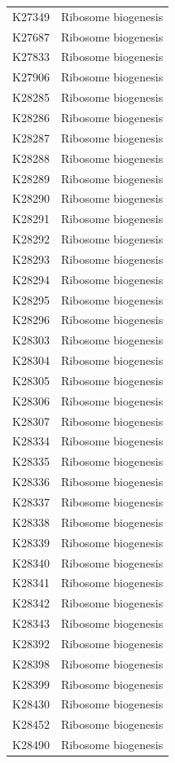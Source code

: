 \begin{longtable}{@{}l l@{}}
K27349 & Ribosome biogenesis \\
K27687 & Ribosome biogenesis \\
K27833 & Ribosome biogenesis \\
K27906 & Ribosome biogenesis \\
K28285 & Ribosome biogenesis \\
K28286 & Ribosome biogenesis \\
K28287 & Ribosome biogenesis \\
K28288 & Ribosome biogenesis \\
K28289 & Ribosome biogenesis \\
K28290 & Ribosome biogenesis \\
K28291 & Ribosome biogenesis \\
K28292 & Ribosome biogenesis \\
K28293 & Ribosome biogenesis \\
K28294 & Ribosome biogenesis \\
K28295 & Ribosome biogenesis \\
K28296 & Ribosome biogenesis \\
K28303 & Ribosome biogenesis \\
K28304 & Ribosome biogenesis \\
K28305 & Ribosome biogenesis \\
K28306 & Ribosome biogenesis \\
K28307 & Ribosome biogenesis \\
K28334 & Ribosome biogenesis \\
K28335 & Ribosome biogenesis \\
K28336 & Ribosome biogenesis \\
K28337 & Ribosome biogenesis \\
K28338 & Ribosome biogenesis \\
K28339 & Ribosome biogenesis \\
K28340 & Ribosome biogenesis \\
K28341 & Ribosome biogenesis \\
K28342 & Ribosome biogenesis \\
K28343 & Ribosome biogenesis \\
K28392 & Ribosome biogenesis \\
K28398 & Ribosome biogenesis \\
K28399 & Ribosome biogenesis \\
K28430 & Ribosome biogenesis \\
K28452 & Ribosome biogenesis \\
K28490 & Ribosome biogenesis \\

\end{longtable}
